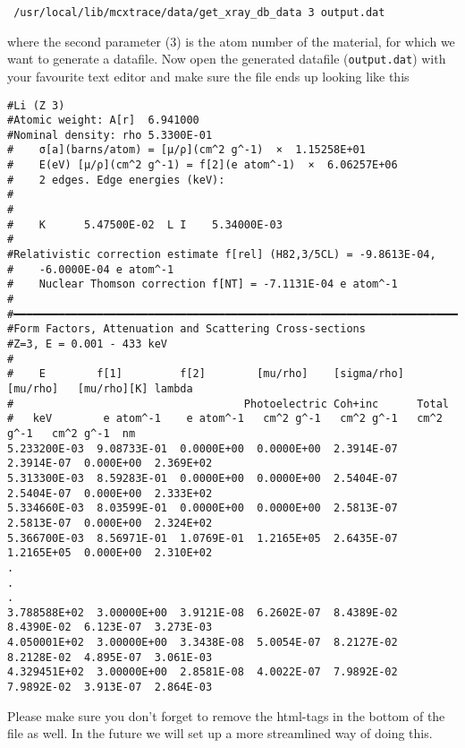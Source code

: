 \begin {verbatim}
 /usr/local/lib/mcxtrace/data/get_xray_db_data 3 output.dat
\end{verbatim}
where the second parameter (3) is the atom number of the material, for which we want to generate a datafile.
Now open the generated datafile (\verb+output.dat+) with your favourite text editor and make sure the file ends up looking like this
\tiny
\begin{verbatim}
#Li (Z 3)
#Atomic weight: A[r]  6.941000
#Nominal density: rho 5.3300E-01
#    σ[a](barns/atom) = [μ/ρ](cm^2 g^-1)  ×  1.15258E+01
#    E(eV) [μ/ρ](cm^2 g^-1) = f[2](e atom^-1)  ×  6.06257E+06
#    2 edges. Edge energies (keV):
#
#
#    K      5.47500E-02  L I    5.34000E-03
#
#Relativistic correction estimate f[rel] (H82,3/5CL) = -9.8613E-04,
#    -6.0000E-04 e atom^-1
#    Nuclear Thomson correction f[NT] = -7.1131E-04 e atom^-1
#
#━━━━━━━━━━━━━━━━━━━━━━━━━━━━━━━━━━━━━━━━━━━━━━━━━━━━━━━━━━━━━━━━━━━━━━━━━━━━━━━
#Form Factors, Attenuation and Scattering Cross-sections
#Z=3, E = 0.001 - 433 keV
#
#    E        f[1]         f[2]        [mu/rho]    [sigma/rho]  [mu/rho]   [mu/rho][K] lambda
#                                    Photoelectric Coh+inc      Total
#   keV        e atom^-1    e atom^-1   cm^2 g^-1   cm^2 g^-1   cm^2 g^-1   cm^2 g^-1  nm
5.233200E-03  9.08733E-01  0.0000E+00  0.0000E+00  2.3914E-07  2.3914E-07  0.000E+00  2.369E+02
5.313300E-03  8.59283E-01  0.0000E+00  0.0000E+00  2.5404E-07  2.5404E-07  0.000E+00  2.333E+02
5.334660E-03  8.03599E-01  0.0000E+00  0.0000E+00  2.5813E-07  2.5813E-07  0.000E+00  2.324E+02
5.366700E-03  8.56971E-01  1.0769E-01  1.2165E+05  2.6435E-07  1.2165E+05  0.000E+00  2.310E+02
.
.
.
3.788588E+02  3.00000E+00  3.9121E-08  6.2602E-07  8.4389E-02  8.4390E-02  6.123E-07  3.273E-03
4.050001E+02  3.00000E+00  3.3438E-08  5.0054E-07  8.2127E-02  8.2128E-02  4.895E-07  3.061E-03
4.329451E+02  3.00000E+00  2.8581E-08  4.0022E-07  7.9892E-02  7.9892E-02  3.913E-07  2.864E-03
\end{verbatim}
\normalsize
Please make sure you don't forget to remove the html-tags in the bottom of the file as well. In the future we will set
up a more streamlined way of doing this.
